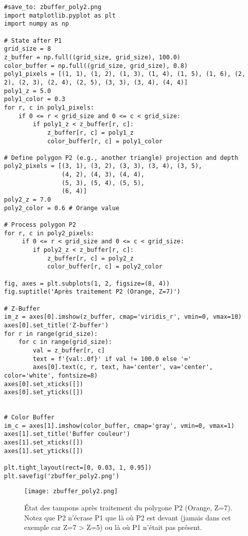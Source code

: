 \documentclass{article}
\begin{document}
\begin{verbatim}
#save_to: zbuffer_poly2.png
import matplotlib.pyplot as plt
import numpy as np

# State after P1
grid_size = 8
z_buffer = np.full((grid_size, grid_size), 100.0)
color_buffer = np.full((grid_size, grid_size), 0.8)
poly1_pixels = [(1, 1), (1, 2), (1, 3), (1, 4), (1, 5), (1, 6), (2, 2), (2, 3), (2, 4), (2, 5), (3, 3), (3, 4), (4, 4)]
poly1_z = 5.0
poly1_color = 0.3
for r, c in poly1_pixels:
    if 0 <= r < grid_size and 0 <= c < grid_size:
        if poly1_z < z_buffer[r, c]:
            z_buffer[r, c] = poly1_z
            color_buffer[r, c] = poly1_color

# Define polygon P2 (e.g., another triangle) projection and depth
poly2_pixels = [(3, 1), (3, 2), (3, 3), (3, 4), (3, 5),
                (4, 2), (4, 3), (4, 4),
                (5, 3), (5, 4), (5, 5),
                (6, 4)]
poly2_z = 7.0
poly2_color = 0.6 # Orange value

# Process polygon P2
for r, c in poly2_pixels:
     if 0 <= r < grid_size and 0 <= c < grid_size:
        if poly2_z < z_buffer[r, c]:
            z_buffer[r, c] = poly2_z
            color_buffer[r, c] = poly2_color

fig, axes = plt.subplots(1, 2, figsize=(8, 4))
fig.suptitle('Après traitement P2 (Orange, Z=7)')

# Z-Buffer
im_z = axes[0].imshow(z_buffer, cmap='viridis_r', vmin=0, vmax=10)
axes[0].set_title('Z-buffer')
for r in range(grid_size):
    for c in range(grid_size):
        val = z_buffer[r, c]
        text = f'{val:.0f}' if val != 100.0 else '∞'
        axes[0].text(c, r, text, ha='center', va='center', color='white', fontsize=8)
axes[0].set_xticks([])
axes[0].set_yticks([])


# Color Buffer
im_c = axes[1].imshow(color_buffer, cmap='gray', vmin=0, vmax=1)
axes[1].set_title('Buffer couleur')
axes[1].set_xticks([])
axes[1].set_yticks([])

plt.tight_layout(rect=[0, 0.03, 1, 0.95])
plt.savefig('zbuffer_poly2.png')
\end{verbatim}

\begin{figure}[H]
\centering
\texttt{[image: zbuffer\_poly2.png]}
\caption{État des tampons après traitement du polygone P2 (Orange, Z=7). Notez que P2 n'écrase P1 que là où P2 est devant (jamais dans cet exemple car Z=7 > Z=5) ou là où P1 n'était pas présent.}
\label{fig:zbuffer_poly2}
\end{figure}
\end{document}
